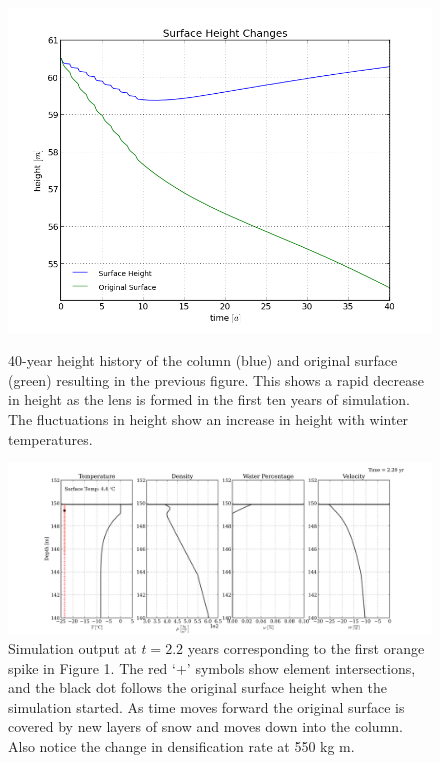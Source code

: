 \begin{figure}
	\centering
		\includegraphics[width=\linewidth]{images/firn/40yrHt.png}
	\label{fig:500 year orbit}
	\caption{40-year height history of the column (blue) and original surface (green) resulting in the previous figure.  This shows a rapid decrease in height as the lens is formed in the first ten years of simulation.  The fluctuations in height show an increase in height with winter temperatures.}
\end{figure}

\begin{figure}
  \centering
    \includegraphics[width=\linewidth]{images/firn/end.png}
	\caption{Simulation output at $t = 2.2$ years corresponding to the first orange spike in Figure 1.  The red `+' symbols show element intersections, and the black dot follows the original surface height when the simulation started.  As time moves forward the original surface is covered by new layers of snow and moves down into the column.  Also notice the change in densification rate at 550 kg m.}
\end{figure}

